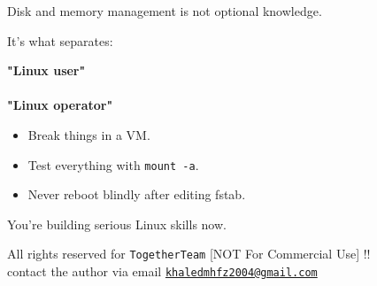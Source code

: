 \documentclass[12pt]{article}
\newcommand{\rocketicon}{\faRocket}
\begin{document}
Disk and memory management is not optional knowledge.

It's what separates:

\begin{center}
\textbf{"Linux user"}\\
\faArrowDown\\
\textbf{"Linux operator"} \rocketicon
\end{center}

\begin{itemize}
    \item Break things in a VM.
    \item Test everything with \texttt{mount -a}.
    \item Never reboot blindly after editing fstab.
\end{itemize}

\begin{infobox}
You're building serious Linux skills now.
\end{infobox}

\vspace{\fill}
\begin{center}
\color{muted}
All rights reserved for \texttt{TogetherTeam} [NOT For Commercial Use] !!\\
contact the author via email \href{mailto:khaledmhfz2004@gmail.com}{\texttt{khaledmhfz2004@gmail.com}}
\end{center}
\end{document}

